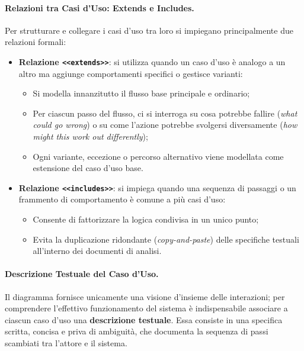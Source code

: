 \documentclass[12pt]{extarticle}
\begin{document}
\paragraph{Relazioni tra Casi d'Uso: Extends e Includes.}
Per strutturare e collegare i casi d'uso tra loro si impiegano principalmente due relazioni formali:
\begin{itemize}
    \item \textbf{Relazione \texttt{<<extends>>}}: si utilizza quando un caso d'uso è analogo a un altro ma aggiunge comportamenti specifici o gestisce varianti:
    \begin{itemize}
        \item Si modella innanzitutto il flusso base principale e ordinario;
        \item Per ciascun passo del flusso, ci si interroga su cosa potrebbe fallire (\textit{what could go wrong}) o su come l'azione potrebbe svolgersi diversamente (\textit{how might this work out differently});
        \item Ogni variante, eccezione o percorso alternativo viene modellata come estensione del caso d'uso base.
    \end{itemize}
    \item \textbf{Relazione \texttt{<<includes>>}}: si impiega quando una sequenza di passaggi o un frammento di comportamento è comune a più casi d'uso:
    \begin{itemize}
        \item Consente di fattorizzare la logica condivisa in un unico punto;
        \item Evita la duplicazione ridondante (\textit{copy-and-paste}) delle specifiche testuali all'interno dei documenti di analisi.
    \end{itemize}
\end{itemize}

\paragraph{Descrizione Testuale del Caso d'Uso.}
Il diagramma fornisce unicamente una visione d'insieme delle interazioni; per comprendere l'effettivo funzionamento del sistema è indispensabile associare a ciascun caso d'uso una \textbf{descrizione testuale}. Essa consiste in una specifica scritta, concisa e priva di ambiguità, che documenta la sequenza di passi scambiati tra l'attore e il sistema. 
\end{document}
